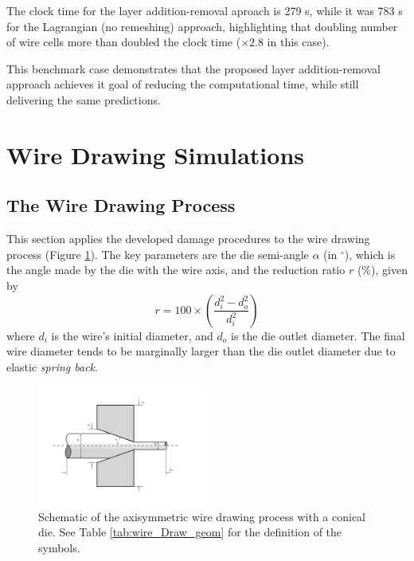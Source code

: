 \documentclass[sn-mathphys,Numbered]{sn-jnl}%
\begin{document}
The clock time for the layer addition-removal aproach is 279 s, while it was 783 s for the Lagrangian (no remeshing) approach, highlighting that doubling number of wire cells more than doubled the clock time ($\times 2.8$ in this case).

This benchmark case demonstrates that the proposed layer addition-removal approach achieves it goal of reducing the computational time, while still delivering the same predictions.



\section{Wire Drawing Simulations} \label{sec:wire_drawing}

\subsection{The Wire Drawing Process}

This section applies the developed damage procedures to the wire drawing process (Figure \ref{fig:wireDrawing}).
The key parameters are the die semi-angle $\alpha$ (in $^{\circ}$), which is the angle made by the die with the wire axis, and the reduction ratio $r$ ($\%$), given by
\begin{equation}
    r = 100 \times \left(\frac{d_i^2 - d_o^2}{d_i^2}\right)
\end{equation}
where $d_i$ is the wire's initial diameter, and $d_o$ is the die outlet diameter.
The final wire diameter tends to be marginally larger than the die outlet diameter due to elastic \emph{spring back}.
\begin{figure}[htb]
\begin{center}
	\includegraphics[width=0.5\textwidth]{./Figures/SimulationAndAnalysis/modelCompare/drawingSchematic.pdf}
	\caption{Schematic of the axisymmetric wire drawing process with a conical die. See Table \ref{tab:wire_Draw_geom} for the definition of the symbols.}
	\label{fig:wireDrawing}
\end{center}
\end{figure}
\end{document}
